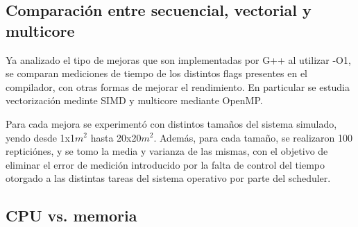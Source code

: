 \subsection{Comparación entre secuencial, vectorial y multicore}
Ya analizado el tipo de mejoras que son implementadas por G++ al utilizar -O1, se comparan mediciones de tiempo de los distintos flags presentes en el compilador, con otras formas de mejorar el rendimiento. En particular se estudia vectorización medinte SIMD y multicore mediante OpenMP.

Para cada mejora se experimentó con distintos tamaños del sistema simulado, yendo desde 1x1$m^2$ hasta 20x20$m^2$. Además, para cada tamaño, se realizaron 100 repticiónes, y se tomo la media y varianza de las mismas, con el objetivo de eliminar el error de medición introducido por la falta de control del tiempo otorgado a las distintas tareas del sistema operativo por parte del scheduler.



\subsection{CPU vs. memoria}


